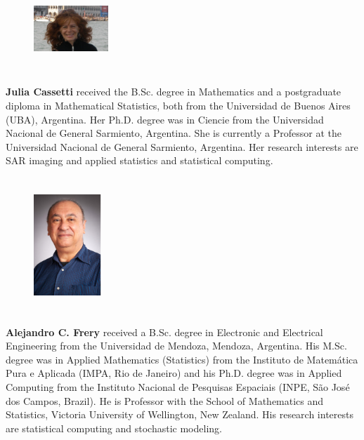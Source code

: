 \documentclass[twocolumn]{svjour3}
\begin{document}
	\begin{figure} 
		\includegraphics[width=1.1in,height=1.3in,clip]{Cassetti}
	\end{figure}\par
	\textbf{Julia Cassetti} received the B.Sc. degree in Mathematics and a postgraduate diploma in Mathematical Statistics, both from the Universidad de Buenos Aires (UBA), Argentina. Her Ph.D. degree was in Ciencie from the Universidad Nacional de General Sarmiento, Argentina. She is currently a Professor at the Universidad Nacional de General Sarmiento, Argentina. Her research interests are SAR imaging and applied statistics and statistical computing.\par
	
	
	\begin{figure} 
		\includegraphics[width=1in,height=2in,clip,keepaspectratio]{Frery}
	\end{figure}\par
	\textbf{Alejandro C. Frery} received a B.Sc. degree in Electronic and Electrical Engineering from the Universidad de Mendoza, Mendoza, Argentina.
	His M.Sc. degree was in Applied Mathematics (Statistics) from the Instituto de Matem\'atica Pura e Aplicada (IMPA, Rio de Janeiro) and his Ph.D. degree was in Applied Computing from the Instituto Nacional de Pesquisas Espaciais (INPE, S\~ao Jos\'e dos Campos, Brazil).
	He is Professor with the School of Mathematics and Statistics, Victoria University of Wellington, New Zealand.
	His research interests are statistical computing and stochastic modeling.
	\par
	
	
\end{document}
